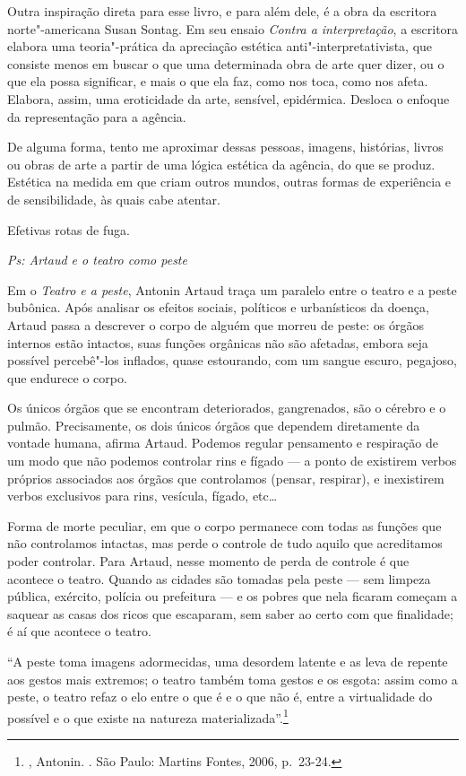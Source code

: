 Outra inspiração direta para esse livro, e para além dele, é a obra da
escritora norte"-americana Susan Sontag. Em seu ensaio \emph{Contra a
interpretação}, a escritora elabora uma teoria"-prática da apreciação estética
anti"-interpretativista, que consiste menos em buscar o que uma
determinada obra de arte quer dizer, ou o que ela possa significar, e
mais o que ela faz, como nos toca, como nos afeta. Elabora, assim, uma
eroticidade da arte, sensível, epidérmica. Desloca o enfoque da
representação para a agência.

De alguma forma, tento me aproximar dessas pessoas, imagens, histórias,
livros ou obras de arte a partir de uma lógica estética da agência, do
que se produz. Estética na medida em que criam outros mundos, outras
formas de experiência e de sensibilidade, às quais cabe atentar.

Efetivas rotas de fuga.

\asterisc

\emph{Ps: Artaud e o teatro como peste}

Em o \emph{Teatro e a peste}, Antonin Artaud traça um paralelo entre o
teatro e a peste bubônica. Após analisar os efeitos sociais, políticos e
urbanísticos da doença, Artaud passa a descrever o corpo de alguém que
morreu de peste: os órgãos internos estão intactos, suas funções
orgânicas não são afetadas, embora seja possível percebê"-los inflados,
quase estourando, com um sangue escuro, pegajoso, que endurece o corpo.

Os únicos órgãos que se encontram deteriorados, gangrenados, são o
cérebro e o pulmão. Precisamente, os dois únicos órgãos que dependem
diretamente da vontade humana, afirma Artaud. Podemos regular
pensamento e respiração de um modo que não podemos controlar rins e
fígado --- a ponto de existirem verbos próprios associados aos órgãos que
controlamos (pensar, respirar), e inexistirem verbos exclusivos para
rins, vesícula, fígado, etc\ldots{}

Forma de morte peculiar, em que o corpo permanece com todas as funções
que não controlamos intactas, mas perde o controle de tudo aquilo que
acreditamos poder controlar. Para Artaud, nesse momento de perda de
controle é que acontece o teatro. Quando as cidades são tomadas pela
peste --- sem limpeza pública, exército, polícia ou prefeitura ---
e os pobres que nela ficaram começam a saquear as casas dos ricos que
escaparam, sem saber ao certo com que finalidade; é aí que acontece o
teatro.

``A peste toma imagens adormecidas, uma desordem latente e as leva de
repente aos gestos mais extremos; o teatro também toma gestos e os
esgota: assim como a peste, o teatro refaz o elo entre o que é e o que
não é, entre a virtualidade do possível e o que existe na natureza
materializada''.\footnote{, Antonin. {}.
  São Paulo: Martins Fontes, 2006, p.~23-24.}

